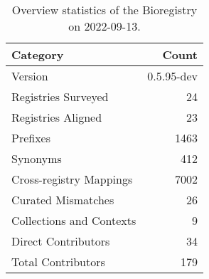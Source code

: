 \begin{table}
\centering
\caption{Overview statistics of the Bioregistry on 2022-09-13.}
\label{tab:bioregistry-summary}
\begin{tabular}{lr}
\toprule
                Category &      Count \\
\midrule
                 Version & 0.5.95-dev \\
     Registries Surveyed &         24 \\
      Registries Aligned &         23 \\
                Prefixes &       1463 \\
                Synonyms &        412 \\
 Cross-registry Mappings &       7002 \\
      Curated Mismatches &         26 \\
Collections and Contexts &          9 \\
     Direct Contributors &         34 \\
      Total Contributors &        179 \\
\bottomrule
\end{tabular}
\end{table}
